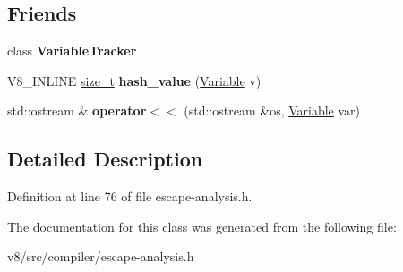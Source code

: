 \subsection*{Friends}
\begin{DoxyCompactItemize}
\item 
\mbox{\label{classv8_1_1internal_1_1compiler_1_1Variable_aeecf7dee0a4496208e852ca5af49b429}} 
class {\bfseries Variable\+Tracker}
\item 
\mbox{\label{classv8_1_1internal_1_1compiler_1_1Variable_a8fe51cc8c705cb005a7f9b8cfe5a4b39}} 
V8\+\_\+\+I\+N\+L\+I\+NE \mbox{\hyperlink{classsize__t}{size\+\_\+t}} {\bfseries hash\+\_\+value} (\mbox{\hyperlink{classv8_1_1internal_1_1compiler_1_1Variable}{Variable}} v)
\item 
\mbox{\label{classv8_1_1internal_1_1compiler_1_1Variable_adfcb2bfb6968bbe327ee582aeeeb42ba}} 
std\+::ostream \& {\bfseries operator$<$$<$} (std\+::ostream \&os, \mbox{\hyperlink{classv8_1_1internal_1_1compiler_1_1Variable}{Variable}} var)
\end{DoxyCompactItemize}


\subsection{Detailed Description}


Definition at line 76 of file escape-\/analysis.\+h.



The documentation for this class was generated from the following file\+:\begin{DoxyCompactItemize}
\item 
v8/src/compiler/escape-\/analysis.\+h\end{DoxyCompactItemize}

